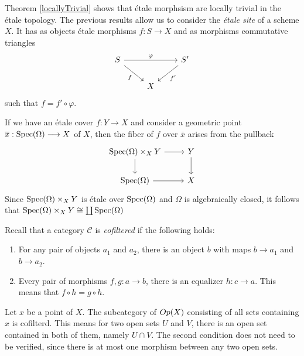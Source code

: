 Theorem \ref{locallyTrivial} shows that \'etale morphsism are locally trivial in the \'etale topology.
The previous results allow us to consider the \textit{\'etale site} of a scheme $X$. It has as objects \'etale morphisms $f: S \to X$ and as morphisms commutative triangles
\[
\begin{tikzcd}
	S && {S'} \\
	& X
	\arrow["\varphi", from=1-1, to=1-3]
	\arrow["{f'}", from=1-3, to=2-2]
	\arrow["f"', from=1-1, to=2-2]
\end{tikzcd}
\]
 such that $f = f' \circ \varphi$. 


\begin{remark}
  If we have an \'etale cover $f: Y \to X$ and consider a geometric point $\overline{x} : \operatorname{Spec}(\Omega) \longrightarrow X$ of $X$, then the fiber of $f$ over $\overline{x}$ arises from the pullback
    \[\begin{tikzcd}
    	{\Spec(\Omega)\times_X Y} & Y \\
    	{\Spec(\Omega)} & X
    	\arrow[from=1-1, to=2-1]
    	\arrow[from=1-1, to=1-2]
    	\arrow[from=1-2, to=2-2]
    	\arrow[from=2-1, to=2-2]
    \end{tikzcd}\]
  Since $\operatorname{Spec}(\Omega)\times_X Y$ is \'etale over $\operatorname{Spec}(\Omega)$ and $\Omega$ is algebraically closed, it follows that $\operatorname{Spec}(\Omega)\times_X Y \cong \coprod \operatorname{Spec}(\Omega)$
\end{remark}

\begin{remark}
  Recall that a category $\mathcal{C}$ is \textit{cofiltered} if the following holds:
  \begin{enumerate}
    \item For any pair of objects $a_1$ and $a_2$, there is an object $b$ with maps $b \to a_1$ and $b \to a_2$.
    \item Every pair of morphisms $f,g: a \to b$, there is an equalizer $h: c \to a$. This means that $f \circ h = g \circ h$.
  \end{enumerate} 
  Let $x$ be a point of $X$. The subcategory of $Op(X)$ consisting of all sets containing $x$ is cofilterd. This means for two open sets $U$ and $V$, there is an open set contained in both of them, namely $U \cap V$. The second condition does not need to be verified, since there is at most one morphism between any two open sets.
\end{remark}

